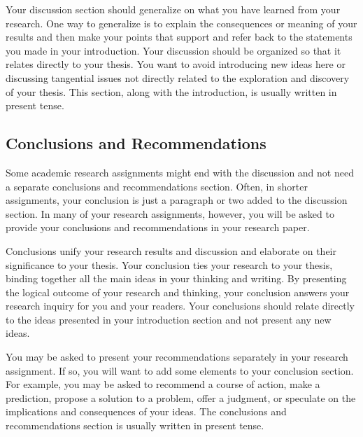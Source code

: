 \documentclass{article}
\begin{document}
Your discussion section should generalize on what you have learned
from your research. One way to generalize is to explain the
consequences or meaning of your results and then make your points that
support and refer back to the statements you made in your
introduction. Your discussion should be organized so that it relates
directly to your thesis. You want to avoid introducing new ideas here
or discussing tangential issues not directly related to the
exploration and discovery of your thesis. This section, along with the
introduction, is usually written in present tense.

\subsection{Conclusions and Recommendations\label{sec:conclude}}

Some academic research assignments might end with the discussion and
not need a separate conclusions and recommendations section. Often, in
shorter assignments, your conclusion is just a paragraph or two added
to the discussion section. In many of your research assignments,
however, you will be asked to provide your conclusions and
recommendations in your research paper.

Conclusions unify your research results and discussion and elaborate
on their significance to your thesis. Your conclusion ties your
research to your thesis, binding together all the main ideas in your
thinking and writing. By presenting the logical outcome of your
research and thinking, your conclusion answers your research inquiry
for you and your readers. Your conclusions should relate directly to
the ideas presented in your introduction section and not present any
new ideas.

You may be asked to present your recommendations separately in your
research assignment. If so, you will want to add some elements to your
conclusion section. For example, you may be asked to recommend a
course of action, make a prediction, propose a solution to a problem,
offer a judgment, or speculate on the implications and consequences of
your ideas. The conclusions and recommendations section is usually
written in present tense.

\nocite{savitsky:03}
\end{document}
